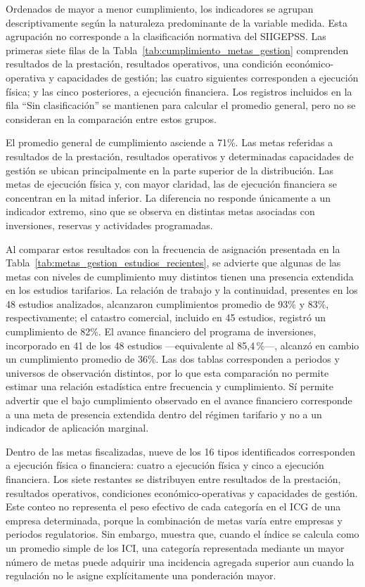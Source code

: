 Ordenados de mayor a menor cumplimiento, los indicadores se agrupan descriptivamente según la naturaleza predominante de la variable medida. Esta agrupación no corresponde a la clasificación normativa del SIIGEPSS. Las primeras siete filas de la Tabla~\ref{tab:cumplimiento_metas_gestion} comprenden resultados de la prestación, resultados operativos, una condición económico-operativa y capacidades de gestión; las cuatro siguientes corresponden a ejecución física; y las cinco posteriores, a ejecución financiera. Los registros incluidos en la fila ``Sin clasificación'' se mantienen para calcular el promedio general, pero no se consideran en la comparación entre estos grupos.

El promedio general de cumplimiento asciende a 71\%. Las metas referidas a resultados de la prestación, resultados operativos y determinadas capacidades de gestión se ubican principalmente en la parte superior de la distribución. Las metas de ejecución física y, con mayor claridad, las de ejecución financiera se concentran en la mitad inferior. La diferencia no responde únicamente a un indicador extremo, sino que se observa en distintas metas asociadas con inversiones, reservas y actividades programadas.

Al comparar estos resultados con la frecuencia de asignación presentada en la Tabla~\ref{tab:metas_gestion_estudios_recientes}, se advierte que algunas de las metas con niveles de cumplimiento muy distintos tienen una presencia extendida en los estudios tarifarios. La relación de trabajo y la continuidad, presentes en los 48 estudios analizados, alcanzaron cumplimientos promedio de 93\% y 83\%, respectivamente; el catastro comercial, incluido en 45 estudios, registró un cumplimiento de 82\%. El avance financiero del programa de inversiones, incorporado en 41 de los 48 estudios ---equivalente al 85,4\,\%---, alcanzó en cambio un cumplimiento promedio de 36\%. Las dos tablas corresponden a periodos y universos de observación distintos, por lo que esta comparación no permite estimar una relación estadística entre frecuencia y cumplimiento. Sí permite advertir que el bajo cumplimiento observado en el avance financiero corresponde a una meta de presencia extendida dentro del régimen tarifario y no a un indicador de aplicación marginal.

Dentro de las metas fiscalizadas, nueve de los 16 tipos identificados corresponden a ejecución física o financiera: cuatro a ejecución física y cinco a ejecución financiera. Los siete restantes se distribuyen entre resultados de la prestación, resultados operativos, condiciones económico-operativas y capacidades de gestión. Este conteo no representa el peso efectivo de cada categoría en el ICG de una empresa determinada, porque la combinación de metas varía entre empresas y periodos regulatorios. Sin embargo, muestra que, cuando el índice se calcula como un promedio simple de los ICI, una categoría representada mediante un mayor número de metas puede adquirir una incidencia agregada superior aun cuando la regulación no le asigne explícitamente una ponderación mayor.

